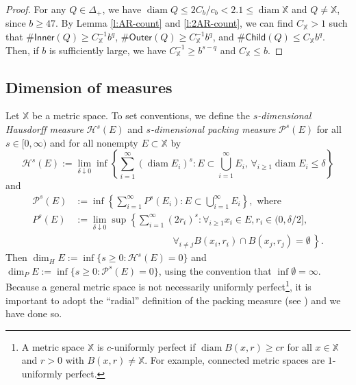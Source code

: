 \documentclass[12pt]{amsart}
\theoremstyle{definition}
\theoremstyle{remark}
\newcommand{\XX}{\mathbb{X}}
\newcommand{\Haus}{\mathcal{H}}
\newcommand{\Pack}{\mathcal{P}}
\newcommand{\diam}{\mathop\mathrm{diam}\nolimits}
\newcommand{\Child}{\mathsf{Child}}
\newcommand{\Outer}{\mathsf{Outer}}
\newcommand{\Inner}{\mathsf{Inner}}
\numberwithin{figure}{section}
\numberwithin{equation}{section}
\begin{document}
\begin{proof} For any $Q\in\Delta_+$, we have $\diam Q\leq 2C_b/c_b<2.1\leq \diam\XX$ and $Q\neq\XX$, since $b\geq 47$. By Lemma \ref{l:AR-count} and \ref{l:2AR-count}, we can find $C_\XX>1$ such that $\#\Inner(Q)\geq C_\XX^{-1} b^q$, $\#\Outer(Q)\geq C_\XX^{-1} b^q$, and $\#\Child(Q)\leq C_\XX b^q$. Then, if $b$ is sufficiently large, we have $C_\XX^{-1}\geq b^{s-q}$ and $C_\XX\leq b$.\end{proof}

\subsection{Dimension of measures}\label{ss:dimension} Let $\XX$ be a metric space. To set conventions, we define the \emph{$s$-dimensional Hausdorff measure} $\Haus^s(E)$ and \emph{$s$-dimensional packing measure} $\Pack^s(E)$ for all $s\in[0,\infty)$ and for all nonempty $E\subset\XX$ by \begin{equation}\Haus^s(E):=\lim_{\delta\downarrow 0} \inf\left\{\textstyle\sum_{i=1}^\infty (\diam E_i)^s : E\subset\textstyle\bigcup_{i=1}^\infty E_i,\,\forall_{i\geq 1}\diam E_i\leq \delta\right\}\end{equation} and \begin{equation} \begin{split} \Pack^s(E)&:=\inf\left\{\textstyle\sum_{i=1}^\infty P^s(E_i):E\subset\textstyle\bigcup_{i=1}^\infty E_i\right\},\text{ where}\\
P^s(E)&:=\lim_{\delta\downarrow 0}\sup\left\{\textstyle\sum_{i=1}^\infty (2r_i)^s: \forall_{i\geq 1} x_i\in E,  r_i\in(0,\delta/2],\,\right. \\
&\qquad\qquad\qquad\qquad\qquad\  \left. \forall_{i\neq j} B(x_i,r_i)\cap B(x_j,r_j)=\emptyset\,\right\}.\end{split}\end{equation} Then $\dim_H E:=\inf\{s\geq 0:\Haus^s(E)=0\}$ and $\dim_P E:=\inf\{s\geq 0:\Pack^s(E)=0\}$, using the convention that $\inf\emptyset=\infty$. Because a general metric space is not necessarily uniformly perfect\footnote{A metric space $\XX$ is $c$-uniformly perfect if $\diam B(x,r)\geq cr$ for all $x\in \XX$ and $r>0$ with $B(x,r)\neq\XX$. For example, connected metric spaces are $1$-uniformly perfect.}, it is important to adopt the ``radial'' definition of the packing measure (see \cite{Cutler-density-theorem}) and we have done so.
\end{document}

